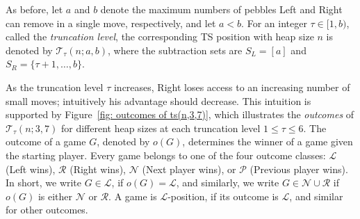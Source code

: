 \documentclass[oneside,reqno]{amsart}
\newcommand{\ts}{\mathcal{T}}
\newcommand{\lp}{\mathscr{L}}
\newcommand{\rp}{\mathscr{R}}
\newcommand{\np}{\mathscr{N}}
\newcommand{\pp}{\mathscr{P}}
\begin{document}

As before, let $a$ and $b$ denote the maximum numbers of pebbles Left and Right can remove in a single move, respectively, and let $a<b$. 
For an integer $\tau\in [1,b)$, called the \emph{truncation level}, the corresponding {\sc TS} position with heap size $n$ is denoted by $\ts_\tau(n;a,b)$, where the subtraction sets are $S_L=[a]$ and $S_R=\{\tau+1,\dots,b\}$. 



As the truncation level $\tau$ increases, Right loses access to an increasing number of small moves; intuitively his advantage should decrease. This intuition is supported by Figure~\ref{fig: outcomes of ts(n,3,7)}, which illustrates the {\em outcomes} of $\ts_\tau(n;3,7)$ for different heap sizes at each truncation level $1\le \tau\le 6$. 
The outcome of a game $G$, denoted by $o(G)$, determines the winner of a game given the starting player. Every game belongs to one of the four outcome classes: $\lp$ (Left wins), $\mathscr{R}$ (Right wins), $\np$ (Next player wins), or $\pp$ (Previous player wins). 
In short, we write $G\in \lp$, if $o(G)=\lp$, and similarly, we write $G\in \np\cup\rp$ if $o(G)$ is either $\np$ or $\rp$. A game is $\lp$-position, if its outcome is $\lp$, and similar for other outcomes.
\end{document}
